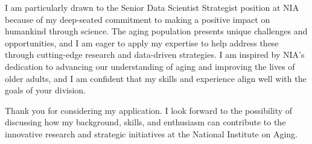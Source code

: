 \documentclass[11pt,letterpaper,sans]{moderncv}        %
\begin{document}
I am particularly drawn to the Senior Data Scientist Strategist position at NIA because of my deep-seated commitment to making a positive impact on humankind through science. The aging population presents unique challenges and opportunities, and I am eager to apply my expertise to help address these through cutting-edge research and data-driven strategies. I am inspired by NIA's dedication to advancing our understanding of aging and improving the lives of older adults, and I am confident that my skills and experience align well with the goals of your division.

Thank you for considering my application. I look forward to the possibility of discussing how my background, skills, and enthusiasm can contribute to the innovative research and strategic initiatives at the National Institute on Aging.

\makeletterclosing
\end{document}
